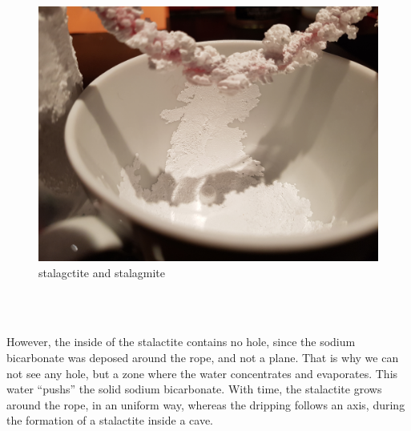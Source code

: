 \documentclass[draft, final]{report}
\begin{document}
\begin{figure}[!ht]
  \centering
  \includegraphics[scale=0.08]{LateX/Images/stalactitestalagmite.jpg}
  \caption{stalagctite and stalagmite}
\end{figure}
~\\[1cm]
~\par
However, the inside of the stalactite contains no hole, since the sodium bicarbonate was deposed around the rope, and not a plane. That is why we can not see any hole, but a zone where the water concentrates and evaporates. This water ``pushs'' the solid sodium bicarbonate. With time, the stalactite grows around the rope, in an uniform way, whereas the dripping follows an axis, during the formation of a stalactite inside a cave.
\\[1cm]
\end{document}
